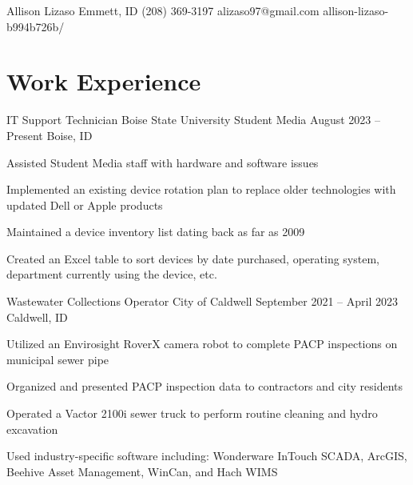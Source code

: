 \documentclass[letterpaper]{resume_config}
\begin{document}
\Header
    {Allison Lizaso} %
    {Emmett, ID} %
    {(208) 369-3197} %
    {alizaso97@gmail.com} %
    {allison-lizaso-b994b726b/} %


\section{Work Experience}

\WorkExperience
    {IT Support Technician} %
    {Boise State University Student Media} %
    {August 2023 -- Present} %
    {Boise, ID} %
    {
        \item Assisted Student Media staff with hardware and software issues
        \item Implemented an existing device rotation plan to replace older technologies with updated Dell or Apple products
        \item Maintained a device inventory list dating back as far as 2009
        \item Created an Excel table to sort devices by date purchased, operating system, department currently using the device, etc.
    } 

\vspace{10pt}

\WorkExperience
    {Wastewater Collections Operator} %
    {City of Caldwell} %
    {September 2021 -- April 2023} %
    {Caldwell, ID} %
    {
        \item Utilized an Envirosight RoverX camera robot to complete PACP inspections on municipal sewer pipe
        \item Organized and presented PACP inspection data to contractors and city residents
        \item Operated a Vactor 2100i sewer truck to perform routine cleaning and hydro excavation
        \item Used industry-specific software including: Wonderware InTouch SCADA, ArcGIS, Beehive Asset Management, WinCan, and Hach WIMS
    }
\end{document}
